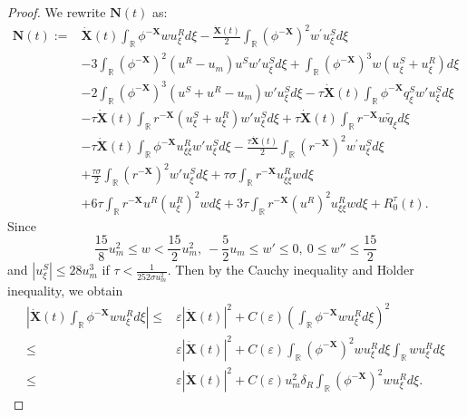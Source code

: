 \documentclass[10pt,a4paper]{amsart}
\begin{document}
	\begin{proof}
		We rewrite $\mathbf{N}(t)$ as:
		\begin{align*}
			\mathbf{N}(t):=&\dot{\mathbf{X}}(t) \int_{\mathbb{R}} \phi^{-\mathbf{X}} w u_{\xi}^{R} d\xi-\frac{\dot{\mathbf{X}}(t)}{2} \int_{\mathbb{R}}\left(\phi^{-\mathbf{X}}\right)^{2} w^{\prime} u_{\xi}^{S} d \xi\nonumber\\
			&-3\int_{\mathbb{R}}(\phi^{-\mathbf{X}})^2(u^R-u_{m})u^Sw'u_{\xi}^Sd\xi+\int_{\mathbb{R}}(\phi^{-\mathbf{X}})^3w(u_{\xi}^S+u_{\xi}^R)d\xi\\
			&-2\int_{\mathbb{R}}(\phi^{-\mathbf{X}})^3(u^S+u^R-u_{m})w'u_{\xi}^Sd\xi-\tau\dot{\mathbf{X}}(t)\int_{\mathbb{R}}\phi^{-\mathbf{X}}q_{\xi}^{S}w'u_{\xi}^{S}d\xi\\
			&-\tau\dot{\mathbf{X}}(t) \int_{\mathbb{R}}r^{-\mathbf{X}}\left(u_{\xi}^{S}+u_{\xi}^{R}\right)w'u_{\xi}^{S}d\xi+\tau\dot{\mathbf{X}}(t)\int_{\mathbb{R}}r^{-\mathbf{X}}w\tilde{q}_{\xi}d\xi\\
			&-\tau\dot{\mathbf{X}}(t)\int_{\mathbb{R}}\phi^{-\mathbf{X}}u_{\xi\xi}^{R}w'u_{\xi}^{S}d\xi-\frac{\tau\dot{\mathbf{X}}(t)}{2}\int_{\mathbb{R}}\left(r^{-\mathbf{X}}\right)^{2} w^{\prime} u_{\xi}^{S} d \xi\nonumber\\
			&+\frac{\tau\sigma}{2}\int_{\mathbb{R}}(r^{-\mathbf{X}})^2w'u_{\xi}^Sd\xi+\tau\sigma\int_{\mathbb{R}}r^{-\mathbf{X}}u_{\xi\xi}^Rwd\xi\nonumber\\
			&+6\tau\int_{\mathbb{R}}r^{-\mathbf{X}}u^R(u_{\xi}^R)^2wd\xi+3\tau\int_{\mathbb{R}}r^{-\mathbf{X}}(u^R)^2u_{\xi\xi}^Rwd\xi+R_0^{\tau}(t).
		\end{align*}
		Since $$\frac{15}{8}u_m^2\leq w < \frac{15}{2}u_m^2,\ -\frac{5}{2}u_m\leq w'\leq0,\ 0\leq w''\leq\frac{15}{2}$$ and $|u_{\xi}^S|\leq28u_m^3$ if $\tau<\frac{1}{252\sigma u_m^2}$. Then by the Cauchy inequality and H$\ddot{\text{o}}$lder inequality, we obtain
		\begin{equation}\label{N1}
			\begin{aligned}
				\left|\dot{\mathbf{X}}(t) \int_{\mathbb{R}} \phi^{-\mathbf{X}} w u_{\xi}^{R} d\xi\right|\leq &\varepsilon\left|\dot{{\mathbf{X}}}(t)\right|^2+C(\varepsilon)\left(\int_{\mathbb{R}}\phi^{-\mathbf{X}}wu_{\xi}^Rd\xi\right)^2\\
				\leq&\varepsilon\left|\dot{{\mathbf{X}}}(t)\right|^2+C(\varepsilon)\int_{\mathbb{R}}\left(\phi^{-\mathbf{X}}\right)^2wu_{\xi}^Rd\xi\int_{\mathbb{R}}wu_{\xi}^Rd\xi\\
				\leq&\varepsilon\left|\dot{{\mathbf{X}}}(t)\right|^2+C(\varepsilon)u_{m}^2\delta_R\int_{\mathbb{R}}\left(\phi^{-\mathbf{X}}\right)^2wu_{\xi}^Rd\xi.

\end{aligned}
\end{equation}
\end{proof}
\end{document}
